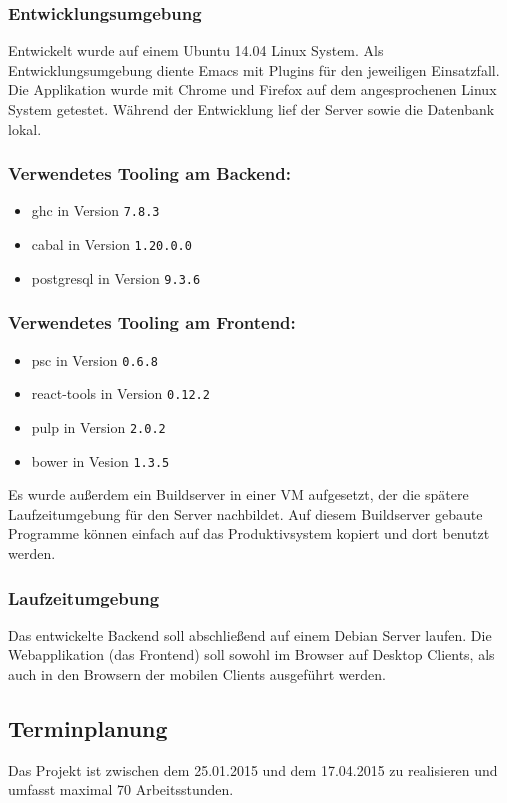 \subsubsection{Entwicklungsumgebung}
Entwickelt wurde auf einem Ubuntu 14.04 Linux System. Als
Entwicklungsumgebung diente Emacs mit Plugins für den jeweiligen
Einsatzfall. Die Applikation wurde mit Chrome und Firefox auf dem
angesprochenen Linux System getestet. Während der Entwicklung lief der
Server sowie die Datenbank lokal.
\subsubsection*{Verwendetes Tooling am Backend:}
\begin{itemize}
\item \gls{ghc} in Version \texttt{7.8.3}
\item \gls{cabal} in Version \texttt{1.20.0.0}
\item \gls{postgresql} in Version \texttt{9.3.6}
\end{itemize}

\subsubsection*{Verwendetes Tooling am Frontend:}
\begin{itemize}
\item \gls{psc} in Version \texttt{0.6.8}
\item \gls{react-tools} in Version \texttt{0.12.2}
\item \gls{pulp} in Version \texttt{2.0.2}
\item \gls{bower} in Vesion \texttt{1.3.5}
\end{itemize}
Es wurde außerdem ein Buildserver in einer VM aufgesetzt, der die
spätere Laufzeitumgebung für den Server nachbildet. Auf diesem
Buildserver gebaute Programme können einfach auf das Produktivsystem
kopiert und dort benutzt werden.
\subsubsection{Laufzeitumgebung}
Das entwickelte Backend soll abschließend auf einem Debian Server
laufen. Die Webapplikation (das Frontend) soll sowohl im Browser auf
Desktop Clients, als auch in den Browsern der mobilen Clients
ausgeführt werden.
\subsection{Terminplanung}
Das Projekt ist zwischen dem 25.01.2015 und dem 17.04.2015 zu
realisieren und umfasst maximal 70 Arbeitsstunden.

